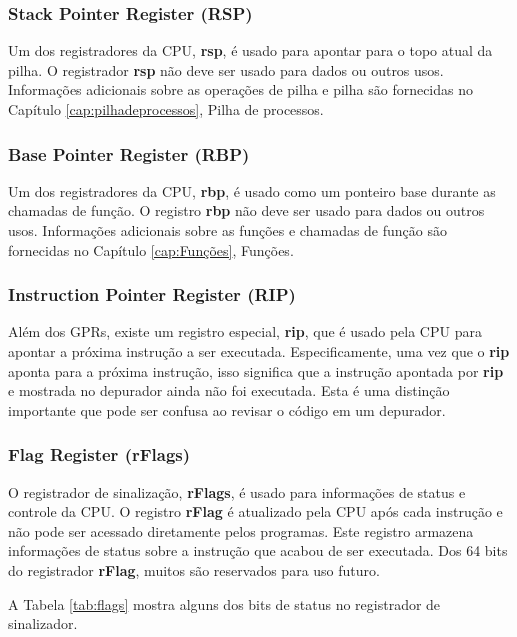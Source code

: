 \subsubsection{Stack Pointer Register (RSP)}
Um dos registradores da CPU, \textbf{rsp}, é usado para apontar para o topo atual da pilha. O registrador \textbf{rsp} não deve ser usado para dados ou outros usos. Informações adicionais sobre as operações de pilha e pilha são fornecidas no Capítulo \ref{cap:pilhadeprocessos}, Pilha de processos.

\subsubsection{Base Pointer Register (RBP)}
Um dos registradores da CPU, \textbf{rbp}, é usado como um ponteiro base durante as chamadas de função. O registro \textbf{rbp} não deve ser usado para dados ou outros usos. Informações adicionais sobre as funções e chamadas de função são fornecidas no Capítulo \ref{cap:Funções}, Funções.


\subsubsection{Instruction Pointer Register (RIP)}
Além dos GPRs, existe um registro especial, \textbf{rip}, que é usado pela CPU para apontar a próxima instrução a ser executada. Especificamente, uma vez que o \textbf{rip} aponta para a próxima instrução, isso significa que a instrução apontada por \textbf{rip} e mostrada no depurador ainda não foi executada. Esta é uma distinção importante que pode ser confusa ao revisar o código em um depurador.

\subsubsection{Flag Register (rFlags)}
O registrador de sinalização, \textbf{rFlags}, é usado para informações de status e controle da CPU. O registro \textbf{rFlag} é atualizado pela CPU após cada instrução e não pode ser acessado diretamente pelos programas. Este registro armazena informações de status sobre a instrução que acabou de ser executada. Dos 64 bits do registrador \textbf{rFlag}, muitos são reservados para uso futuro.

A Tabela \ref{tab:flags} mostra alguns dos bits de status no registrador de sinalizador.

